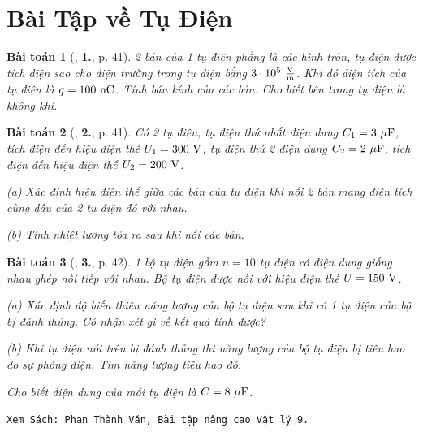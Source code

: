 \documentclass[oneside]{book}
\numberwithin{equation}{section}
\newtheorem{baitoan}{Bài toán}[section]
\begin{document}

\section{Bài Tập về Tụ Điện}

\begin{baitoan}[\cite{SGK_Vat_Ly_11_nang_cao}, \textbf{1.}, p. 41]
	2 bản của 1 tụ điện phẳng là các hình tròn, tụ điện được tích điện sao cho điện trường trong tụ điện bằng $3\cdot 10^5\ \frac{\rm V}{\rm m}$. Khi đó điện tích của tụ điện là $q = 100\ {\rm nC}$. Tính bán kính của các bản. Cho biết bên trong tụ điện là không khí.
\end{baitoan}

\begin{baitoan}[\cite{SGK_Vat_Ly_11_nang_cao}, \textbf{2.}, p. 41]
	Có 2 tụ điện, tụ điện thứ nhất điện dung $C_1 = 3\ \mu{\rm F}$, tích điện đến hiệu điện thế $U_1 = 300\ {\rm V}$, tụ điện thứ 2 điện dung $C_2 = 2\ \mu{\rm F}$, tích điện đến hiệu điện thế $U_2 = 200\ {\rm V}$.
	\begin{enumerate*}
		\item[(a)] Xác định hiệu điện thế giữa các bản của tụ điện khi nối 2 bản mang điện tích cùng dấu của 2 tụ điện đó với nhau.
		\item[(b)] Tính nhiệt lượng tỏa ra sau khi nối các bản.
	\end{enumerate*}
\end{baitoan}

\begin{baitoan}[\cite{SGK_Vat_Ly_11_nang_cao}, \textbf{3.}, p. 42]
	1 bộ tụ điện gồm $n = 10$ tụ điện có điện dung giống nhau ghép nối tiếp với nhau. Bộ tụ điện được nối với hiệu điện thế $U = 150\ {\rm V}$.
	\begin{enumerate*}
		\item[(a)] Xác định độ biến thiên năng lượng của bộ tụ điện sau khi có 1 tụ điện của bộ bị đánh thủng. Có nhận xét gì về kết quả tính được?
		\item[(b)] Khi tụ điện nói trên bị đánh thủng thì năng lượng của bộ tụ điện bị tiêu hao do sự phóng điện. Tìm năng lượng tiêu hao đó.
	\end{enumerate*}
	Cho biết điện dung của mỗi tụ điện là $C = 8\ \mu{\rm F}$.
\end{baitoan}
\texttt{Xem Sách: Phan Thành Văn, Bài tập nâng cao Vật lý 9.}
\end{document}
